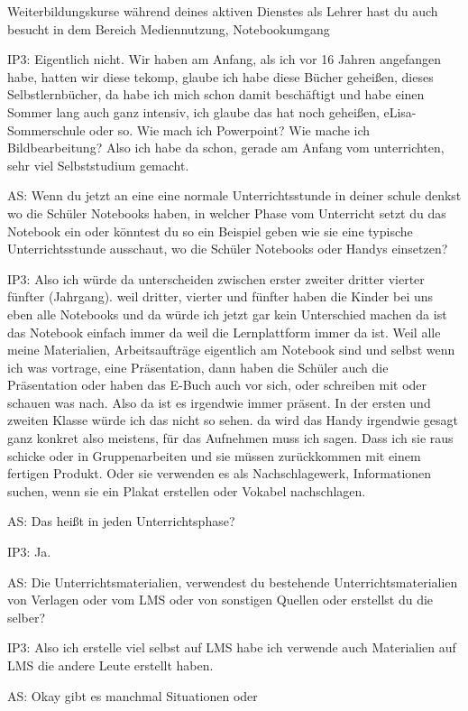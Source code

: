 \documentclass[fontsize=11pt,paper=a4]{scrbook}
\begin{document}
{\begin{itemize*}
Weiterbildungskurse während deines
aktiven Dienstes als Lehrer hast du auch
besucht in dem Bereich Mediennutzung, Notebookumgang
\item[IP3:] Eigentlich nicht. Wir haben am Anfang, als ich vor 16 Jahren angefangen
habe, hatten wir diese tekomp, glaube ich
habe diese Bücher geheißen, dieses Selbstlernbücher, da habe ich mich schon damit
beschäftigt und habe einen Sommer lang
auch ganz intensiv, ich glaube das hat
noch geheißen, eLisa-Sommerschule oder so.
Wie mach ich Powerpoint? Wie mache ich
Bildbearbeitung? Also ich habe da schon, gerade am Anfang vom unterrichten, sehr viel
Selbststudium gemacht. 
\item[AS:] Wenn du jetzt an
eine eine normale Unterrichtsstunde
in deiner schule denkst wo die
Schüler Notebooks haben, in welcher Phase vom
Unterricht setzt du das Notebook ein oder könntest du so ein Beispiel
geben wie sie eine typische
Unterrichtsstunde ausschaut, wo die
Schüler Notebooks oder Handys einsetzen?
\item[IP3:] Also ich würde da unterscheiden zwischen
erster zweiter dritter vierter fünfter (Jahrgang).
weil dritter, vierter und fünfter haben die
Kinder bei uns eben alle Notebooks und da
würde ich jetzt gar kein Unterschied
machen
da ist das Notebook einfach immer da
weil die Lernplattform immer da ist. Weil alle meine Materialien, 
Arbeitsaufträge eigentlich am Notebook
sind und selbst wenn ich was vortrage, eine Präsentation, 
dann 
haben die Schüler auch die Präsentation
oder haben das E-Buch auch vor sich, oder
schreiben mit oder schauen was nach. Also
da ist es irgendwie immer präsent. In der
ersten und zweiten Klasse würde ich das nicht so
sehen. da wird das Handy irgendwie gesagt
ganz konkret also meistens, für das Aufnehmen muss ich sagen. Dass ich
sie raus schicke oder in Gruppenarbeiten
und sie müssen zurückkommen mit einem fertigen Produkt. Oder sie verwenden es als
Nachschlagewerk, Informationen suchen, wenn sie ein Plakat erstellen oder Vokabel nachschlagen.
\item[AS:] Das heißt in jeden Unterrichtsphase?
\item[IP3:] Ja.
\item[AS:]Die
Unterrichtsmaterialien, verwendest du
bestehende Unterrichtsmaterialien von Verlagen oder vom LMS oder von
sonstigen Quellen oder erstellst du die selber?
\item[IP3:] Also ich erstelle viel selbst auf
LMS habe ich verwende auch Materialien
auf LMS die andere Leute erstellt haben.
\item[AS:] Okay gibt es manchmal Situationen oder

\end{itemize*}}
\end{document}
